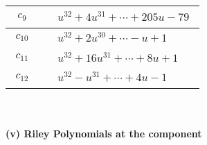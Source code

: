 \documentclass[1p]{elsarticle_modified}
\theoremstyle{definition}
\begin{document}
\begin{tabular}{m{50pt}|m{274pt}}
\hline $$\begin{aligned}c_{9}\end{aligned}$$&$\begin{aligned}
&u^{32}+4 u^{31}+\cdots+205 u-79
\end{aligned}$\\
\hline $$\begin{aligned}c_{10}\end{aligned}$$&$\begin{aligned}
&u^{32}+2 u^{30}+\cdots- u+1
\end{aligned}$\\
\hline $$\begin{aligned}c_{11}\end{aligned}$$&$\begin{aligned}
&u^{32}+16 u^{31}+\cdots+8 u+1
\end{aligned}$\\
\hline $$\begin{aligned}c_{12}\end{aligned}$$&$\begin{aligned}
&u^{32}- u^{31}+\cdots+4 u-1
\end{aligned}$\\
\hline
\end{tabular}\\~\\
\newpage\renewcommand{\arraystretch}{1}
\flushleft \textbf{(v) Riley Polynomials at the component}\newline \\
\end{document}
